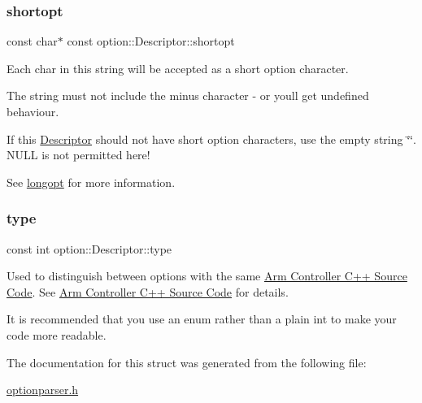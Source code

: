 \subsubsection{\texorpdfstring{shortopt}{shortopt}}
{\footnotesize\ttfamily const char$\ast$ const option\+::\+Descriptor\+::shortopt}



Each char in this string will be accepted as a short option character. 

The string must not include the minus character {\ttfamily \textquotesingle{}-\/\textquotesingle{}} or you\textquotesingle{}ll get undefined behaviour.

If this \hyperlink{structoption_1_1Descriptor}{Descriptor} should not have short option characters, use the empty string \char`\"{}\char`\"{}. N\+U\+LL is not permitted here!

See \hyperlink{structoption_1_1Descriptor_a470c449dfa894c9bfda2dae026142b4b}{longopt} for more information. \mbox{\label{structoption_1_1Descriptor_a1b220dabd8aad075fa441a80f9b9343c}} 
\subsubsection{\texorpdfstring{type}{type}}
{\footnotesize\ttfamily const int option\+::\+Descriptor\+::type}



Used to distinguish between options with the same \hyperlink{index}{Arm Controller C++ Source Code}. See \hyperlink{index}{Arm Controller C++ Source Code} for details. 

It is recommended that you use an enum rather than a plain int to make your code more readable. 

The documentation for this struct was generated from the following file\+:\begin{DoxyCompactItemize}
\item 
\hyperlink{optionparser_8h}{optionparser.\+h}\end{DoxyCompactItemize}

